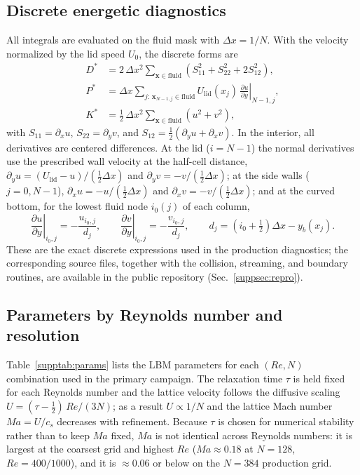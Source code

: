 \subsection{Discrete energetic diagnostics}

All integrals are evaluated on the fluid mask with $\Delta x=1/N$. With the velocity normalized by the lid speed $U_0$, the discrete forms are
\begin{align}
D^* &= 2\,\Delta x^2\sum_{\mathbf{x}\in\text{fluid}}
\left(S_{11}^2+S_{22}^2+2S_{12}^2\right),
\label{eq:Dstar-discrete}\\
P^* &= \Delta x\sum_{j:\,\mathbf{x}_{N-1,j}\in\text{fluid}} U_{\mathrm{lid}}(x_j)\,
\left.\frac{\partial u}{\partial y}\right|_{N-1,j},
\label{eq:Pstar-discrete}\\
K^* &= \tfrac12\,\Delta x^2\sum_{\mathbf{x}\in\text{fluid}}\left(u^2+v^2\right),
\label{eq:Kstar-discrete}
\end{align}
with $S_{11}=\partial_xu$, $S_{22}=\partial_yv$, and $S_{12}=\tfrac12(\partial_yu+\partial_xv)$. In the interior, all derivatives are centered differences. At the lid ($i=N-1$) the normal derivatives use the prescribed wall velocity at the half-cell distance, $\partial_yu=(U_{\mathrm{lid}}-u)/(\tfrac12\Delta x)$ and $\partial_yv=-v/(\tfrac12\Delta x)$; at the side walls ($j=0,N-1$), $\partial_xu=-u/(\tfrac12\Delta x)$ and $\partial_xv=-v/(\tfrac12\Delta x)$; and at the curved bottom, for the lowest fluid node $i_0(j)$ of each column,
\begin{equation}
\left.\frac{\partial u}{\partial y}\right|_{i_0,j}=-\frac{u_{i_0,j}}{d_j},
\qquad
\left.\frac{\partial v}{\partial y}\right|_{i_0,j}=-\frac{v_{i_0,j}}{d_j},
\qquad
d_j=(i_0+\tfrac12)\Delta x-y_b(x_j).
\label{eq:wallgrad}
\end{equation}
These are the exact discrete expressions used in the production diagnostics; the corresponding source files, together with the collision, streaming, and boundary routines, are available in the public repository (Sec.~\ref{suppsec:repro}).

\subsection{Parameters by Reynolds number and resolution}

Table~\ref{supptab:params} lists the LBM parameters for each $(Re,N)$ combination used in the primary campaign. The relaxation time $\tau$ is held fixed for each Reynolds number and the lattice velocity follows the diffusive scaling $U=(\tau-\tfrac12)\,Re/(3N)$; as a result $U\propto 1/N$ and the lattice Mach number $Ma = U/c_s$ decreases with refinement. Because $\tau$ is chosen for numerical stability rather than to keep $Ma$ fixed, $Ma$ is not identical across Reynolds numbers: it is largest at the coarsest grid and highest $Re$ ($Ma\approx0.18$ at $N=128$, $Re=400/1000$), and it is $\approx0.06$ or below on the $N=384$ production grid.

